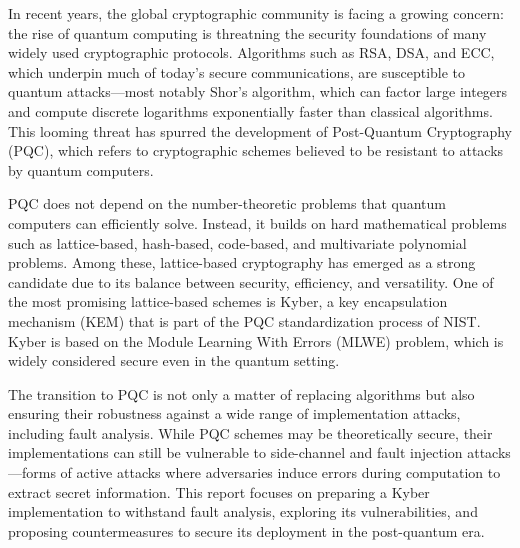 
In recent years, the global cryptographic community is facing a growing concern: the rise of quantum computing is threatning the security foundations of many widely used cryptographic protocols. Algorithms such as RSA, DSA, and ECC, which underpin much of today’s secure communications, are susceptible to quantum attacks—most notably Shor’s algorithm, which can factor large integers and compute discrete logarithms exponentially faster than classical algorithms. This looming threat has spurred the development of Post-Quantum Cryptography (PQC), which refers to cryptographic schemes believed to be resistant to attacks by quantum computers.

PQC does not depend on the number-theoretic problems that quantum computers can efficiently solve. Instead, it builds on hard mathematical problems such as lattice-based, hash-based, code-based, and multivariate polynomial problems. Among these, lattice-based cryptography has emerged as a strong candidate due to its balance between security, efficiency, and versatility. One of the most promising lattice-based schemes is Kyber, a key encapsulation mechanism (KEM) that is part of the  PQC standardization process of NIST. Kyber is based on the Module Learning With Errors (MLWE) problem, which is widely considered secure even in the quantum setting.

The transition to PQC is not only a matter of replacing algorithms but also ensuring their robustness against a wide range of implementation attacks, including fault analysis. While PQC schemes may be theoretically secure, their implementations can still be vulnerable to side-channel and fault injection attacks—forms of active attacks where adversaries induce errors during computation to extract secret information. This report focuses on preparing a Kyber implementation to withstand fault analysis, exploring its vulnerabilities, and proposing countermeasures to secure its deployment in the post-quantum era.

